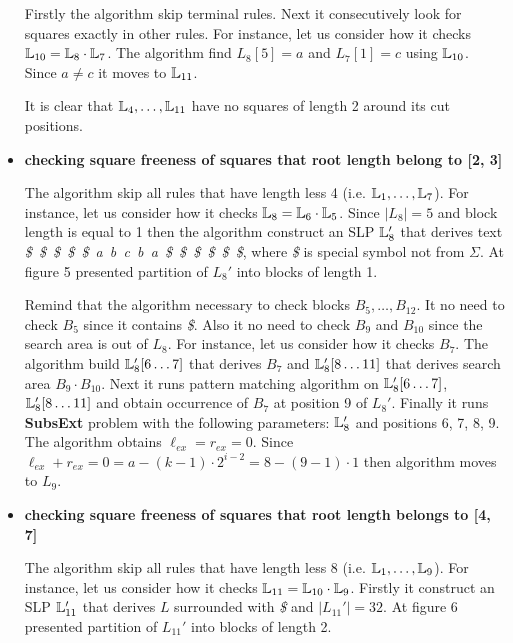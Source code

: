 ﻿\documentclass[11pt]{article}
\begin{document}
\begin{appendix}
\begin{itemize}
  Firstly the algorithm skip terminal rules. Next it consecutively look for squares exactly in other rules. For
  instance, let us consider how it checks $\mathbb{L}_{10} = \mathbb{L}_{8} \cdot \mathbb{L}_{7}$. The algorithm find $L_8[5] = a$ and $L_7[1] = c$
  using $\mathbb{L}_{10}$. Since $a \neq c$ it moves to $\mathbb{L}_{11}$.
  
  It is clear that $\mathbb{L}_4, \dots, \mathbb{L}_{11}$ have no squares of length 2 around its cut positions.
  \item \textbf{checking square freeness of squares that root length belong to [2, 3]}
  
  The algorithm skip all rules that have length less 4 (i.e. $\mathbb{L}_1, \dots, \mathbb{L}_7$). For instance, let us
  consider how it checks $\mathbb{L}_{8} = \mathbb{L}_{6} \cdot \mathbb{L}_{5}$. Since $|L_8| = 5$ and block length is equal to 1 then the algorithm
  construct an SLP $\mathbb{L}_8'$ that derives text \emph{\$~\$~\$~\$~\$~a~b~c~b~a~\$~\$~\$~\$~\$~\$}, where \emph{\$} is
  special symbol not from $\Sigma$. At figure 5 presented partition of $L_8'$ into blocks of length 1.
  
  \LeechWordPartitionSimple
  
  Remind that the algorithm necessary to check blocks $B_5, \dots, B_{12}$. It no need to check $B_5$ since it contains
  \emph{\$}. Also it no need to check $B_9$ and $B_{10}$ since the search area is out of $L_8$. For instance, let us
  consider how it checks $B_7$. The algorithm build $\mathbb{L}_8'[6\dots7]$ that derives $B_7$ and  
  $\mathbb{L}_8'[8\dots11]$ that derives search area $B_9 \cdot B_{10}$. Next it runs pattern matching algorithm on
  $\mathbb{L}_8'[6\dots7]$, $\mathbb{L}_8'[8\dots11]$ and obtain occurrence of $B_7$ at position 9 of $L_8'$. Finally
  it runs \textbf{SubsExt} problem with the following parameters: $\mathbb{L}_8'$ and positions 6, 7, 8, 9. The algorithm
  obtains $\ell_{ex} = r_{ex} = 0$. Since $\ell_{ex} + r_{ex} = 0 = a - (k - 1) \cdot 2^{i-2} = 8 - (9 - 1) \cdot 1$ then
  algorithm moves to $L_9$.

  \item \textbf{checking square freeness of squares that root length belongs to [4, 7]}
  
  The algorithm skip all rules that have length less 8 (i.e. $\mathbb{L}_1, \dots, \mathbb{L}_9$). For instance, let us
  consider how it checks $\mathbb{L}_{11} = \mathbb{L}_{10} \cdot \mathbb{L}_{9}$. Firstly it construct an SLP $\mathbb{L}_{11}'$ that derives $L$
  surrounded with \emph{\$} and $|L_{11}'| = 32$. At figure 6 presented partition of $L_{11}'$ into blocks of length
  2. 
  

\end{itemize}
\end{appendix}
\end{document}
